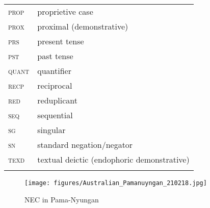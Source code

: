 \documentclass[output=paper,draft,draftmode,colorlinks,citecolor=brown]{langscibook}
\begin{document}
\begin{tabularx}{.5\textwidth}{lQ@{}}
{\textsc{prop}}&proprietive case\\
{\textsc{prox}}&proximal (demonstrative)\\
{\textsc{prs}}&present tense\\
{\textsc{pst}}&past tense\\
{\textsc{quant}}&quantifier\\
{\textsc{recp}}&reciprocal\\
{\textsc{red}}&reduplicant\\
{\textsc{seq}}&sequential\\
{\textsc{sg}}&singular\\
{\textsc{sn}}&standard negation/negator\\
{\textsc{texd}}&textual deictic (endophoric demonstrative)\\
\\
\end{tabularx}

\begin{sidewaysfigure}
    \texttt{[image: figures/Australian\_Pamanuyngan\_210218.jpg]}
    \caption{NEC in Pama-Nyungan}
    \label{fig:NECPama-Nyungan}
\end{sidewaysfigure}

\clearpage

{\sloppy\printbibliography[heading=subbibliography,notkeyword=this]}
\end{document}
